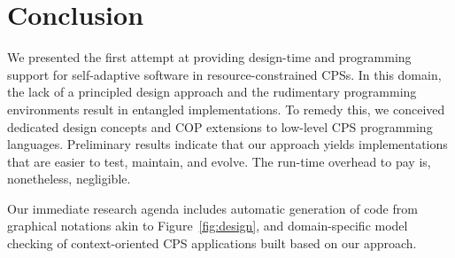 \section{Conclusion}
\label{sec:ending}

We presented the first attempt at providing design-time and
programming support for self-adaptive software in
re\-sour\-ce-constrained CPSs. In this domain, the lack of a
principled design approach and the rudimentary programming
environments result in entangled implementations. To remedy this, we
conceived dedicated design concepts and COP extensions to low-level
CPS programming languages. Preliminary results indicate that our
approach yields implementations that are easier to test,
maintain, and evolve. The run-time overhead to pay is, nonetheless,
negligible.

Our immediate research agenda includes automatic generation of \conesc
code from graphical notations akin to Figure~\ref{fig:design}, and
domain-specific model checking of context-oriented CPS applications
built based on our approach.

